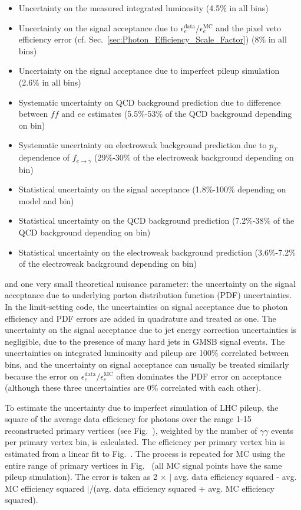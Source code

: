 \documentclass[dissertation.tex]{subfiles}
\begin{document}
\begin{itemize}
\item Uncertainty on the measured integrated luminosity (4.5\% in all bins) \cite{CMS_PAS_EWK-11-001}
\item Uncertainty on the signal acceptance due to $\epsilon_{e}^{\mathrm{data}}/\epsilon_{e}^{\mathrm{MC}}$ and the pixel veto efficiency error (cf. Sec.~\ref{sec:Photon_Efficiency_Scale_Factor}) (8\% in all bins)
\item Uncertainty on the signal acceptance due to imperfect pileup simulation (2.6\% in all bins)
\item Systematic uncertainty on QCD background prediction due to difference between $\mathit{ff}$ and $ee$ estimates (5.5\%-53\% of the QCD background depending on bin)
\item Systematic uncertainty on electroweak background prediction due to $p_{T}$ dependence of $f_{e\rightarrow\gamma}$ (29\%-30\% of the electroweak background depending on bin)
\item Statistical uncertainty on the signal acceptance (1.8\%-100\% depending on model and bin)
\item Statistical uncertainty on the QCD background prediction (7.2\%-38\% of the QCD background depending on bin)
\item Statistical uncertainty on the electroweak background prediction (3.6\%-7.2\% of the electroweak background depending on bin)
\end{itemize}
%
and one very small theoretical nuisance parameter: the uncertainty on the signal acceptance due to underlying parton distribution function (PDF) uncertainties.  In the limit-setting code, the uncertainties on signal acceptance due to photon efficiency and PDF errors are added in quadrature and treated as one.  The uncertainty on the signal acceptance due to jet energy correction uncertainties is negligible, due to the presence of many hard jets in GMSB signal events.  The uncertainties on integrated luminosity and pileup are 100\% correlated between \MET bins, and the uncertainty on signal acceptance can usually be treated similarly because the error on $\epsilon_{e}^{\mathrm{data}}/\epsilon_{e}^{\mathrm{MC}}$ often dominates the PDF error on acceptance (although these three uncertainties are 0\% correlated with each other).

To estimate the uncertainty due to imperfect simulation of LHC pileup, the square of the average data efficiency for photons over the range 1-15 reconstructed primary vertices (see Fig.~), weighted by the number of $\gamma\gamma$ events per primary vertex bin, is calculated.  The efficiency per primary vertex bin is estimated from a linear fit to Fig.~.  The process is repeated for MC using the entire range of primary vertices in Fig.~ (all MC signal points have the same pileup simulation).  The error is taken as 2 $\times$ $|$ avg. data efficiency squared - avg. MC efficiency squared $|$/(avg. data efficiency squared + avg. MC efficiency squared).
\end{document}
